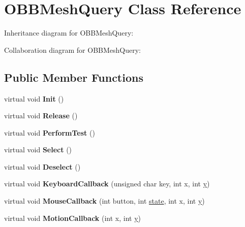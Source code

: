 \hypertarget{class_o_b_b_mesh_query}{\section{O\+B\+B\+Mesh\+Query Class Reference}
\label{class_o_b_b_mesh_query}
}


Inheritance diagram for O\+B\+B\+Mesh\+Query\+:


Collaboration diagram for O\+B\+B\+Mesh\+Query\+:
\subsection*{Public Member Functions}
\begin{DoxyCompactItemize}
\item 
\hypertarget{class_o_b_b_mesh_query_a6da664b3fbd294b310c940c8eb9446c4}{virtual void {\bfseries Init} ()}\label{class_o_b_b_mesh_query_a6da664b3fbd294b310c940c8eb9446c4}

\item 
\hypertarget{class_o_b_b_mesh_query_aa2fa268ae6dec7ec35dfb5afcf827e04}{virtual void {\bfseries Release} ()}\label{class_o_b_b_mesh_query_aa2fa268ae6dec7ec35dfb5afcf827e04}

\item 
\hypertarget{class_o_b_b_mesh_query_a12422c7328bdae307bdca2ebb0458cd6}{virtual void {\bfseries Perform\+Test} ()}\label{class_o_b_b_mesh_query_a12422c7328bdae307bdca2ebb0458cd6}

\item 
\hypertarget{class_o_b_b_mesh_query_ad5c51242513a46f3eab9e07f47c12878}{virtual void {\bfseries Select} ()}\label{class_o_b_b_mesh_query_ad5c51242513a46f3eab9e07f47c12878}

\item 
\hypertarget{class_o_b_b_mesh_query_af1ef1e4506e9dbe5733e3079228a00bd}{virtual void {\bfseries Deselect} ()}\label{class_o_b_b_mesh_query_af1ef1e4506e9dbe5733e3079228a00bd}

\item 
\hypertarget{class_o_b_b_mesh_query_ae528195db89f38a0d53737d838ebcab7}{virtual void {\bfseries Keyboard\+Callback} (unsigned char key, int x, int \hyperlink{_ice_utils_8h_aa7ffaed69623192258fb8679569ff9ba}{y})}\label{class_o_b_b_mesh_query_ae528195db89f38a0d53737d838ebcab7}

\item 
\hypertarget{class_o_b_b_mesh_query_a21be6b1ec396d8c4f569071da5ddd171}{virtual void {\bfseries Mouse\+Callback} (int button, int \hyperlink{structstate}{state}, int x, int \hyperlink{_ice_utils_8h_aa7ffaed69623192258fb8679569ff9ba}{y})}\label{class_o_b_b_mesh_query_a21be6b1ec396d8c4f569071da5ddd171}

\item 
\hypertarget{class_o_b_b_mesh_query_aa33ba34dcc5a73c927300966392fa413}{virtual void {\bfseries Motion\+Callback} (int x, int \hyperlink{_ice_utils_8h_aa7ffaed69623192258fb8679569ff9ba}{y})}\label{class_o_b_b_mesh_query_aa33ba34dcc5a73c927300966392fa413}

\end{DoxyCompactItemize}
